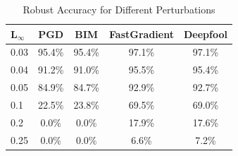 \documentclass[10pt, conference, a4paper, final]{IEEEtran}
\begin{document}
\begin{table}[ht]
    \centering
    \caption{Robust Accuracy for Different Perturbations}
    \label{tab:robust_accuracy}
    \begin{tabular}{|l|c|c|c|c|}
    \hline
    \textbf{L\ensuremath{_{\infty}}} & \textbf{PGD} & \textbf{BIM} & \textbf{FastGradient} & \textbf{Deepfool} \\ \hline
     0.03        & 95.4\%       & 95.4\%       & 97.1\%               & 97.1\%           \\ \hline
     0.04        & 91.2\%       & 91.0\%       & 95.5\%               & 95.4\%           \\ \hline
     0.05        & 84.9\%       & 84.7\%       & 92.9\%               & 92.7\%           \\ \hline
     0.1         & 22.5\%       & 23.8\%       & 69.5\%               & 69.0\%           \\ \hline
     0.2         & 0.0\%        & 0.0\%        & 17.9\%               & 17.6\%           \\ \hline
     0.25        & 0.0\%        & 0.0\%        & 6.6\%                & 7.2\%            \\ \hline
    \end{tabular}
    \end{table}

   
    
\end{document}
